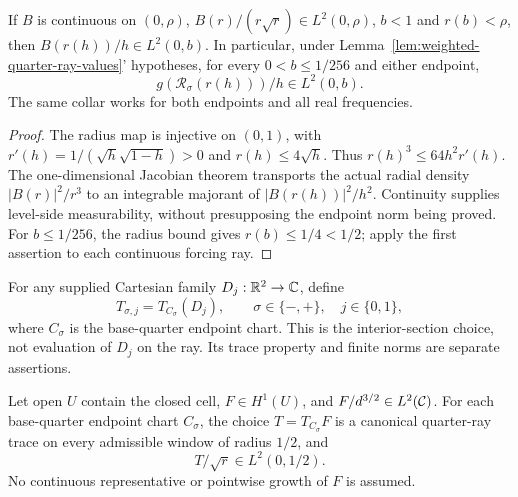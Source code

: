 \begin{lemma}
\label{lem:weighted-endpoint-value-transport}
\leanok
If $B$ is continuous on $(0,\rho)$,
$B(r)/(r\sqrt r)\in L^2(0,\rho)$,
$b<1$ and $r(b)<\rho$, then $B(r(h))/h\in L^2(0,b)$.
In particular, under Lemma~\ref{lem:weighted-quarter-ray-values}' hypotheses,
for every $0<b\le1/256$ and either endpoint,
\[
 g(\mathcal R_\sigma(r(h)))/h\in L^2(0,b).
\]
The same collar works for both endpoints and all real frequencies.
\end{lemma}

\begin{proof}
\leanok
The radius map is injective on $(0,1)$, with
$r'(h)=1/(\sqrt h\sqrt{1-h})>0$ and $r(h)\le4\sqrt h$.
Thus $r(h)^3\le64h^2r'(h)$.
The one-dimensional Jacobian theorem transports the actual radial density
$|B(r)|^2/r^3$ to an integrable majorant of $|B(r(h))|^2/h^2$.
Continuity supplies level-side measurability, without presupposing
the endpoint norm being proved.
For $b\le1/256$, the radius bound gives $r(b)\le1/4<1/2$;
apply the first assertion to each continuous forcing ray.
\end{proof}

\begin{definition}
\label{def:canonical-quarter-gradient-trace}
\leanok
For any supplied Cartesian family $D_j:\mathbb{R}^2\to\mathbb{C}$, define
\[
 T_{\sigma,j}=T_{C_\sigma}(D_j),\qquad \sigma\in\{-,+\},\quad j\in\{0,1\},
\]
where $C_\sigma$ is the base-quarter endpoint chart.
This is the interior-section choice, not evaluation of $D_j$ on the ray.
Its trace property and finite norms are separate assertions.
\end{definition}

\begin{lemma}
\label{lem:weighted-h1-ray-traces}
\leanok
Let open $U$ contain the closed cell, $F\in H^1(U)$, and
$F/d^{3/2}\in L^2(\mathcal{C})$.
For each base-quarter endpoint chart $C_\sigma$, the choice
$T=T_{C_\sigma}F$ is a canonical quarter-ray trace on every admissible
window of radius $1/2$, and
\[
 T/\sqrt r\in L^2(0,1/2).
\]
No continuous representative or pointwise growth of $F$ is assumed.
\end{lemma}

